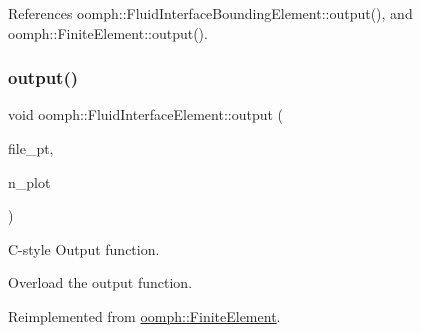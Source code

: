 References oomph\+::\+Fluid\+Interface\+Bounding\+Element\+::output(), and oomph\+::\+Finite\+Element\+::output().

\mbox{\label{classoomph_1_1FluidInterfaceElement_a57efd66ae07fab9e0cf98ac5f8eeb000}} 
\subsubsection{\texorpdfstring{output()}{output()}\hspace{0.1cm}{\footnotesize\ttfamily [4/4]}}
{\footnotesize\ttfamily void oomph\+::\+Fluid\+Interface\+Element\+::output (\begin{DoxyParamCaption}\item[{F\+I\+LE $\ast$}]{file\+\_\+pt,  }\item[{const unsigned \&}]{n\+\_\+plot }\end{DoxyParamCaption})\hspace{0.3cm}{\ttfamily [virtual]}}



C-\/style Output function. 

Overload the output function. 

Reimplemented from \hyperlink{classoomph_1_1FiniteElement_adfaee690bb0608f03320eeb9d110d48c}{oomph\+::\+Finite\+Element}.



